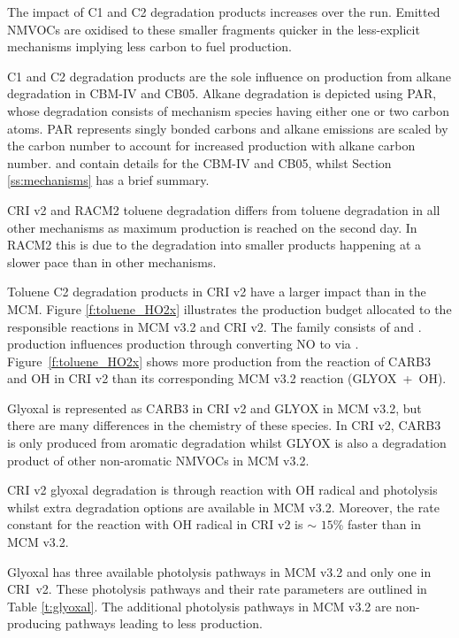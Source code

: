 The impact of C1 and C2 degradation products increases over the run.
Emitted NMVOCs are oxidised to these smaller fragments quicker in the less-explicit mechanisms implying less carbon to fuel  production.

C1 and C2 degradation products are the sole influence on  production from alkane degradation in CBM-IV and CB05.
Alkane degradation is depicted using PAR, whose degradation consists of mechanism species having either one or two carbon atoms.
PAR represents singly bonded carbons and alkane emissions are scaled by the carbon number to account for increased  production with alkane carbon number.
\citet{Hogo:1989} and \citet{Yarwood:2005} contain details for the CBM-IV and CB05, whilst Section \ref{ss:mechanisms} has a brief summary.

CRI v2 and RACM2 toluene degradation differs from toluene degradation in all other mechanisms as maximum  production is reached on the second day. 
In RACM2 this is due to the degradation into smaller products happening at a slower pace than in other mechanisms.

Toluene C2 degradation products in CRI v2 have a larger impact than in the MCM.  
Figure \ref{f:toluene_HO2x} illustrates the  production budget allocated to the responsible reactions in MCM v3.2 and CRI v2. 
The  family consists of  and .
 production influences  production through  converting NO to  via .
\mbox{Figure \ref{f:toluene_HO2x}} shows more  production from the reaction of CARB3 and OH in CRI v2 than its corresponding MCM v3.2 reaction (\mbox{GLYOX + OH}).

Glyoxal is represented as CARB3 in CRI v2 and GLYOX in MCM v3.2, but there are many differences in the chemistry of these species.
In CRI v2, CARB3 is only produced from aromatic degradation whilst GLYOX is also a degradation product of other non-aromatic NMVOCs in MCM v3.2. 

CRI v2 glyoxal degradation is through reaction with OH radical and photolysis whilst extra degradation options are available in MCM v3.2. 
Moreover, the rate constant for the reaction with OH radical in CRI v2 is $\sim$ $15$\% faster than in MCM v3.2. 

Glyoxal has three available photolysis pathways in MCM v3.2 and only one in \mbox{CRI v2}. 
These photolysis pathways and their rate parameters are outlined in Table \ref{t:glyoxal}. 
The additional photolysis pathways in MCM v3.2 are non- producing pathways leading to less  production.

